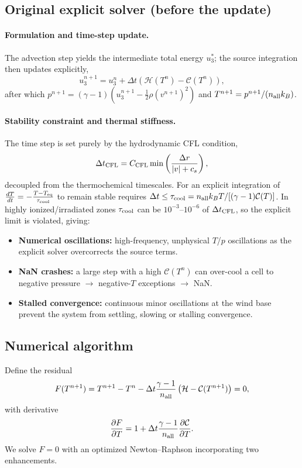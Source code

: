 \documentclass[english,a4paper]{kiseon_memo}
\begin{document}
\subsection{Original explicit solver (before the update)}
\paragraph{Formulation and time-step update.} The advection step yields the
intermediate total energy $u_3^*$; the source integration then updates explicitly,
\begin{equation}
  u^{n+1}_3 = u^n_3 + \Delta t \left( \mathcal{H}(T^n) - \mathcal{C}(T^n) \right),
\end{equation}
after which $p^{n+1}=(\gamma-1)(u_3^{n+1}-\tfrac12\rho (v^{n+1})^2)$ and
$T^{n+1}=p^{n+1}/(n_{\rm all}k_B)$.

\paragraph{Stability constraint and thermal stiffness.} The time step is set purely
by the hydrodynamic CFL condition,
\begin{equation}
  \Delta t_{\rm CFL} = C_{\rm CFL} \min \left( \frac{\Delta r}{|v| + c_s} \right),
\end{equation}
decoupled from the thermochemical timescales. For an explicit integration of
$\frac{dT}{dt} = -\frac{T - T_{\rm eq}}{\tau_{\rm cool}}$ to remain stable requires
$\Delta t \le \tau_{\rm cool} = n_{\rm all} k_B T / [(\gamma-1)\mathcal{C}(T)]$.
In highly ionized/irradiated zones $\tau_{\rm cool}$ can be $10^{-3}$--$10^{-6}$
of $\Delta t_{\rm CFL}$, so the explicit limit is violated, giving:
\begin{itemize}
  \item \textbf{Numerical oscillations:} high-frequency, unphysical $T$/$p$
    oscillations as the explicit solver overcorrects the source terms.
  \item \textbf{NaN crashes:} a large step with a high $\mathcal{C}(T^n)$ can
    over-cool a cell to negative pressure $\to$ negative-$T$ exceptions $\to$ NaN.
  \item \textbf{Stalled convergence:} continuous minor oscillations at the wind
    base prevent the system from settling, slowing or stalling convergence.
\end{itemize}

\subsection{Numerical algorithm}
Define the residual
\begin{equation}
  F(T^{n+1}) = T^{n+1} - T^n - \Delta t \frac{\gamma - 1}{n_{\rm all}} \left( \mathcal{H} - \mathcal{C}(T^{n+1}) \right) = 0,
\end{equation}
with derivative
\begin{equation}
  \frac{\partial F}{\partial T} = 1 + \Delta t \frac{\gamma - 1}{n_{\rm all}} \frac{\partial \mathcal{C}}{\partial T}.
\end{equation}
We solve $F=0$ with an optimized Newton--Raphson incorporating two enhancements.
\end{document}
